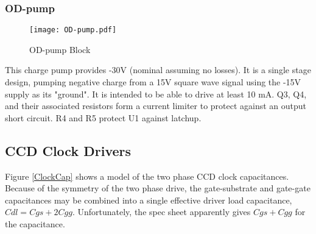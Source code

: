 \documentclass[a4paper,12pt]{article}
\begin{document}


\subsubsection{OD-pump}

   \begin{figure}
   \begin{center}
   \texttt{[image: OD-pump.pdf]}
   \end{center}
   \caption{OD-pump Block}
   \end{figure}
   
This charge pump provides -30V (nominal assuming no losses). It is a single stage design, pumping negative charge from a 15V square wave signal using the -15V supply as its "ground". It is intended to be able to drive at least 10 mA. Q3, Q4, and their associated resistors form a current limiter to protect against an output short circuit. R4 and R5 protect U1 against latchup.






\pagebreak
\subsection{CCD Clock Drivers}
\label{ClockDrivers}
Figure \ref{ClockCap} shows a model of the two phase CCD clock capacitances.  Because of the symmetry of the two phase drive, the gate-substrate and gate-gate capacitances may be combined into a single effective driver load capacitance, $Cdl=Cgs+2Cgg$. Unfortunately, the spec sheet apparently gives $Cgs+Cgg$ for the capacitance.
\end{document}
